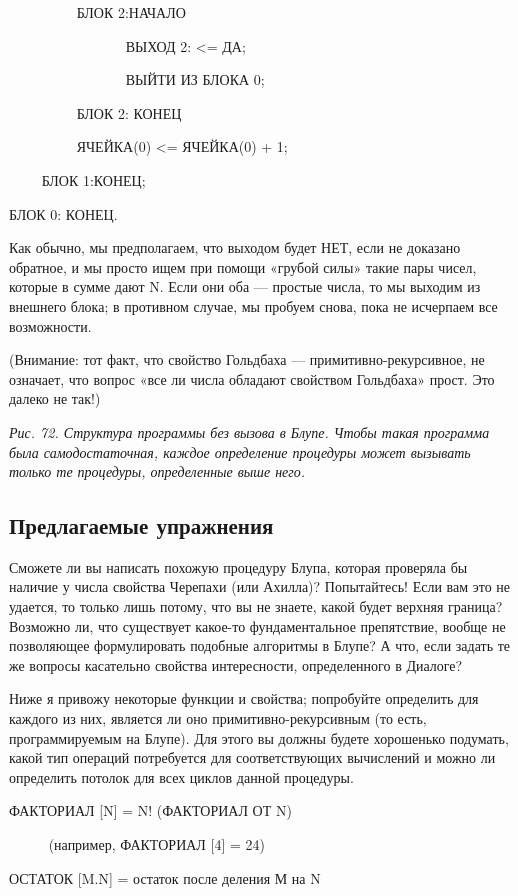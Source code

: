 \documentclass[../main.tex]{subfiles}
\begin{document}
~~~~~~~~~ БЛОК 2:НАЧАЛО

~~~~~~~~~~~~~~~~ ВЫХОД 2: \textless= ДА;

~~~~~~~~~~~~~~~~ ВЫЙТИ ИЗ БЛОКА 0;

~~~~~~~~~ БЛОК 2: КОНЕЦ

~~~~~~~~~ ЯЧЕЙКА(0) \textless= ЯЧЕЙКА(0) + 1;

~~~~ БЛОК 1:КОНЕЦ;

БЛОК 0: КОНЕЦ.

Как обычно, мы предполагаем, что выходом будет НЕТ, если не доказано обратное, и мы просто ищем при помощи «грубой силы» такие пары чисел, которые в сумме дают N. Если они оба --- простые числа, то мы выходим из внешнего блока; в противном случае, мы пробуем снова, пока не исчерпаем все возможности.

(Внимание: тот факт, что свойство Гольдбаха --- примитивно-рекурсивное, не означает, что вопрос «все ли числа обладают свойством Гольдбаха» прост. Это далеко не так!)

\emph{Рис. 72. Структура программы без вызова в Блупе. Чтобы такая программа была самодостаточная, каждое определение процедуры может вызывать только те процедуры, определенные выше него.}


\subsection{Предлагаемые упражнения}

Сможете ли вы написать похожую процедуру Блупа, которая проверяла бы наличие у числа свойства Черепахи (или Ахилла)? Попытайтесь! Если вам это не удается, то только лишь потому, что вы не знаете, какой будет верхняя граница? Возможно ли, что существует какое-то фундаментальное препятствие, вообще не позволяющее формулировать подобные алгоритмы в Блупе? А что, если задать те же вопросы касательно свойства интересности, определенного в Диалоге?

Ниже я привожу некоторые функции и свойства; попробуйте определить для каждого из них, является ли оно примитивно-рекурсивным (то есть, программируемым на Блупе). Для этого вы должны будете хорошенько подумать, какой тип операций потребуется для соответствующих вычислений и можно ли определить потолок для всех циклов данной процедуры.

ФАКТОРИАЛ {[}N{]} = N! (ФАКТОРИАЛ ОТ N)

~~~~~ (например, ФАКТОРИАЛ {[}4{]} = 24)

ОСТАТОК {[}M.N{]} = остаток после деления М на N
\end{document}
